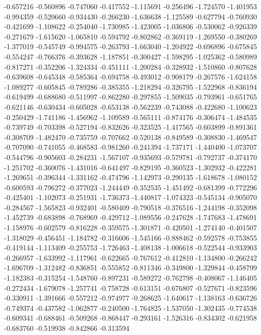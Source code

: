 -0.657216
-0.560896
-0.747060
-0.417552
-1.115691
-0.256496
-1.724570
-1.401953
-0.994359
-0.520660
-0.934430
-0.266230
-1.636638
-1.125589
-0.627794
-0.760930
-0.421699
-1.108622
-0.254040
-1.730985
-1.423005
-1.036806
-0.530062
-0.926339
-0.271679
-1.615620
-1.065810
-0.594792
-0.802862
-0.369119
-1.269550
-0.380269
-1.377019
-0.545749
-0.994575
-0.263793
-1.663040
-1.204922
-0.696896
-0.675845
-0.554247
-0.766376
-0.393628
-1.187851
-0.300427
-1.598295
-1.025362
-0.580989
-0.817271
-0.352206
-1.324334
-0.451111
-1.200284
-0.328932
-1.510860
-0.807628
-0.639608
-0.645348
-0.585364
-0.694758
-0.493012
-0.908179
-0.267576
-1.624158
-1.089277
-0.605845
-0.789286
-0.385355
-1.218294
-0.326795
-1.522968
-0.836194
-0.619499
-0.688680
-0.511997
-0.862280
-0.297855
-1.509035
-0.793961
-0.651765
-0.621146
-0.630434
-0.605028
-0.653138
-0.562239
-0.743088
-0.422680
-1.100623
-0.250429
-1.741186
-1.456962
-1.109589
-0.565111
-0.874176
-0.306474
-1.484535
-0.739749
-0.703398
-0.527194
-0.832626
-0.323525
-1.417565
-0.603899
-0.891361
-0.308709
-1.482470
-0.735759
-0.707662
-0.520138
-0.849589
-0.308830
-1.469547
-0.707090
-0.741055
-0.468583
-0.981260
-0.241394
-1.737171
-1.440400
-1.073707
-0.544796
-0.905603
-0.284231
-1.567107
-0.935693
-0.579781
-0.792737
-0.374170
-1.251702
-0.360076
-1.431016
-0.641497
-0.829195
-0.360523
-1.302932
-0.422281
-1.269651
-0.396344
-1.331162
-0.474796
-1.142973
-0.290135
-1.618678
-1.080152
-0.600593
-0.796272
-0.377023
-1.244449
-0.352535
-1.451492
-0.681399
-0.772296
-0.425401
-1.102073
-0.251931
-1.736373
-1.440817
-1.074323
-0.545134
-0.905070
-0.284567
-1.565823
-0.932401
-0.580409
-0.790518
-0.376516
-1.244198
-0.352098
-1.452739
-0.683898
-0.768969
-0.429712
-1.089556
-0.247628
-1.747683
-1.478691
-1.158976
-0.602579
-0.816228
-0.359575
-1.301871
-0.420501
-1.274140
-0.401507
-1.318029
-0.456451
-1.184782
-0.316606
-1.545166
-0.888462
-0.592578
-0.753855
-0.419144
-1.113409
-0.255753
-1.726463
-1.408138
-1.006618
-0.522544
-0.933903
-0.266957
-1.633992
-1.117961
-0.622665
-0.767612
-0.412810
-1.134800
-0.266242
-1.696709
-1.312482
-0.836851
-0.555852
-0.811346
-0.349800
-1.329844
-0.458799
-1.182383
-0.315254
-1.548760
-0.897231
-0.589272
-0.762798
-0.408067
-1.146405
-0.272434
-1.679078
-1.257741
-0.758728
-0.613151
-0.676807
-0.527671
-0.823596
-0.330911
-1.391666
-0.557212
-0.974977
-0.268625
-1.640617
-1.138163
-0.636726
-0.749374
-0.437582
-1.062877
-0.240500
-1.764825
-1.537050
-1.302435
-0.774538
-0.609341
-0.688461
-0.509268
-0.868447
-0.293161
-1.526316
-0.834302
-0.621958
-0.683760
-0.519938
-0.842866
-0.313594
